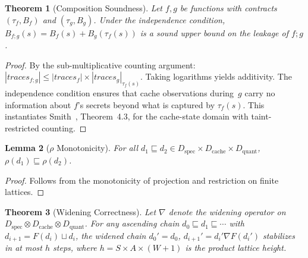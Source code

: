 \documentclass{article}
\newtheorem{theorem}{Theorem}[section]
\newtheorem{lemma}[theorem]{Lemma}
\theoremstyle{definition}
\theoremstyle{remark}
\newcommand{\Dspec}{D_{\text{spec}}}
\newcommand{\Dcache}{D_{\text{cache}}}
\newcommand{\Dquant}{D_{\text{quant}}}
\begin{document}
\begin{theorem}[Composition Soundness]
\label{thm:composition-app}
Let $f, g$ be functions with contracts $(\tau_f, B_f)$ and $(\tau_g, B_g)$.
Under the independence condition,
$B_{f;g}(s) = B_f(s) + B_g(\tau_f(s))$
is a sound upper bound on the leakage of $f;g$.
\end{theorem}

\begin{proof}
By the sub-multiplicative counting argument:
$|\mathit{traces}_{f;g}| \le |\mathit{traces}_f| \times |\mathit{traces}_g|_{\tau_f(s)}$.
Taking logarithms yields additivity.  The independence condition ensures that
cache observations during~$g$ carry no information about $f$'s secrets beyond
what is captured by $\tau_f(s)$.  This instantiates
Smith~\cite{smith2009foundations}, Theorem~4.3, for the cache-state domain with
taint-restricted counting.
\end{proof}

\begin{lemma}[$\rho$ Monotonicity]
\label{lem:rho-mono-app}
For all $d_1 \sqsubseteq d_2 \in \Dspec \times \Dcache \times \Dquant$,
$\rho(d_1) \sqsubseteq \rho(d_2)$.
\end{lemma}

\begin{proof}
Follows from the monotonicity of projection and restriction on finite lattices.
\end{proof}

\begin{theorem}[Widening Correctness]
\label{thm:widening-app}
Let $\nabla$ denote the widening operator on $\Dspec \otimes \Dcache \otimes \Dquant$.
For any ascending chain $d_0 \sqsubseteq d_1 \sqsubseteq \cdots$ with
$d_{i+1} = F(d_i) \sqcup d_i$, the widened chain $d_0' = d_0$,
$d_{i+1}' = d_i' \nabla F(d_i')$ stabilizes in at most $h$ steps, where
$h = S \times A \times (W + 1)$ is the product lattice height.
\end{theorem}
\end{document}
